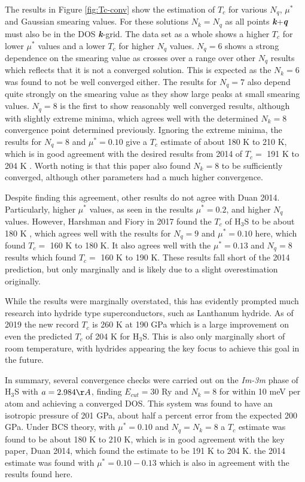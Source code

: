 \documentclass[a4paper,12pt]{article}
\begin{document}
\bigskip
\noindent The results in Figure \ref{fig:Tc-conv} show the estimation of $T_c$ for various $N_q$, $\mu^*$ and Gaussian smearing values. For these solutions $N_k = N_q$ as all points \textbf{\textit{k}}+\textbf{\textit{q}} must also be in the DOS \textbf{\textit{k}}-grid. The data set as a whole shows a higher $T_c$ for lower $\mu^*$ values and a lower $T_c$ for higher $N_q$ values. $N_q=6$ shows a strong dependence on the smearing value as crosses over a range over other $N_q$ results which reflects that it is not a converged solution. This is expected as the $N_k=6$ was found to not be well converged either. The results for $N_q=7$ also depend quite strongly on the smearing value as they show large peaks at small smearing values. $N_q=8$ is the first to show reasonably well converged results, although with slightly extreme minima, which agrees well with the determined $N_k=8$ convergence point determined previously. Ignoring the extreme minima, the results for $N_q=8$ and $\mu^*=0.10$ give a $T_c$ estimate of about 180 K to 210 K, which is in good agreement with the desired results from 2014 of $T_c=$ 191 K to 204 K \cite{duan}. Worth noting is that this paper also found $N_k=8$ to be sufficiently converged, although other parameters had a much higher convergence. 

\bigskip
\noindent Despite finding this agreement, other results do not agree with Duan 2014. Particularly, higher $\mu^*$ values, as seen in the results $\mu^*=0.2$, and higher $N_q$ values. However, Harshman and Fiory in 2017 found the $T_c$ of H$_3$S to be about 180 K \cite{Harshman_2017}, which agrees well with the results for $N_q=9$ and $\mu^*=0.10$ here, which found $T_c=$ 160 K to 180 K. It also agrees well with the $\mu^*=0.13$ and $N_q=8$ results which found $T_c=$ 160 K to 190 K. These results fall short of the 2014 prediction, but only marginally and is likely due to a slight overestimation originally. 

\bigskip
\noindent While the results were marginally overstated, this has evidently prompted much research into hydride type superconductors, such as Lanthanum hydride. As of 2019 the new record $T_c$ is 260 K at 190 GPa \cite{Drozdov_2019, Somayazulu_2019} which is a large improvement on even the predicted $T_c$ of 204 K for H$_3$S. This is also only marginally short of room temperature, with hydrides appearing the key focus to achieve this goal in the future.

\bigskip
\noindent In summary, several convergence checks were carried out on the \textit{Im-3m} phase of H$_3$S with $a=2.984\AA$, finding $E_{cut}=30$ Ry and $N_k=8$ for within 10 meV per atom and achieving a converged DOS. This system was found to have an isotropic pressure of 201 GPa, about half a percent error from the expected 200 GPa. Under BCS theory, with $\mu^*=0.10$ and $N_q=N_k=8$ a $T_c$ estimate was found to be about 180 K to 210 K, which is in good agreement with the key paper, Duan 2014, which found the estimate to be 191 K to 204 K. the 2014 estimate was found with $\mu^*=0.10-0.13$ which is also in agreement with the results found here.

\printbibliography
\end{document}
